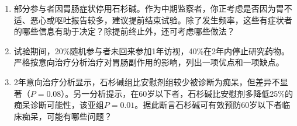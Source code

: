 \begin{enumerate}
\begin{enumerate}
\item 每次随访都用包括腹泻、恶心、呕吐的清单，询问是否出现这些症状。
\item 每次随访问开放式问题，例如：“上次访视以来，你有任何新症状或健康状况吗？”
\end{enumerate}
\item 部分参与者因胃肠症状停用石杉碱。作为中期监察者，你正考虑是否因为胃不适、恶心或呕吐报告较多，建议提前结束试验。除了发生频率，这些有症状者的哪些信息有助于决定？除提前终止外，还可考虑哪些做法？
\item 试验期间，20\%随机参与者未回来参加1年访视，40\%在2年内停止研究药物。严格按意向治疗分析治疗对胃肠副作用的影响，列出一项优点和一项缺点。
\item 2年意向治疗分析显示，石杉碱组比安慰剂组较少被诊断为痴呆，但差异不显著（$P=0.08$）。另一分析提示，在60岁以下者，石杉碱比安慰剂多降低25\%的痴呆诊断可能性，该亚组$P=0.01$。据此断言石杉碱可有效预防60岁以下者临床痴呆，可能有哪些问题？
\end{enumerate}
